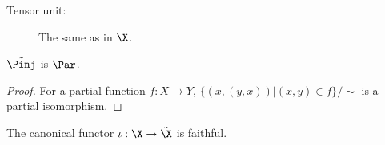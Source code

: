 \begin{definition}
\begin{description}
\item[Tensor unit:]  The same as in $\X$.
\end{description}

\end{definition}


\begin{example}\cite[Ex. 5.3.3]{giles}
$\tilde \Pinj$ is $\Par$.
\end{example}
\begin{proof}
For a partial function $f:X\to Y$, $\{(x,(y,x)) | (x,y) \in f \}/\sim$ is a partial isomorphism.
\end{proof}



\begin{lemma}
\label{lemma:xtildefaithful}
The canonical functor $\iota:\X\to \tilde \X$ is faithful.
\end{lemma}

